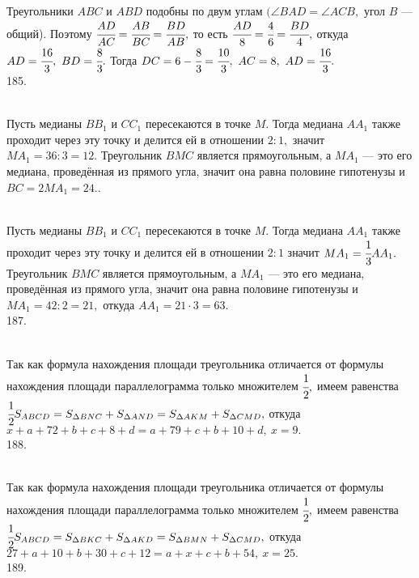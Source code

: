 Треугольники $ABC$ и $ABD$ подобны по двум углам $(\angle BAD = \angle ACB,$ угол $B$ --- общий). Поэтому $\cfrac{AD}{AC}=\cfrac{AB}{BC}=\cfrac{BD}{AB},$ то есть
$\cfrac{AD}{8}=\cfrac{4}{6}=\cfrac{BD}{4},$ откуда $AD=\cfrac{16}{3},\ BD=\cfrac{8}{3}.$ Тогда $DC=6-\cfrac{8}{3}=\cfrac{10}{3},\ AC=8,\ AD=\cfrac{16}{3}.$\\
185. \begin{figure}[ht!]
\end{figure}\\
Пусть медианы $BB_1$ и $CC_1$ пересекаются в точке $M.$ Тогда медиана $AA_1$ также проходит через эту точку и делится ей в отношении $2:1,$ значит $MA_1=36:3=12.$ Треугольник $BMC$ является прямоугольным, а $MA_1$ --- это его медиана, проведённая из прямого угла, значит она равна половине гипотенузы и $BC=2MA_1=24.$\newpage{}. \begin{figure}[ht!]
\end{figure}\\
Пусть медианы $BB_1$ и $CC_1$ пересекаются в точке $M.$ Тогда медиана $AA_1$ также проходит через эту точку и делится ей в отношении $2:1$ значит $MA_1=\cfrac{1}{3}AA_1.$ Треугольник $BMC$ является прямоугольным, а $MA_1$ --- это его медиана, проведённая из прямого угла, значит она равна половине гипотенузы и $MA_1=42:2=21,$ откуда $AA_1=21\cdot3=63.$\\
187. \begin{figure}[ht!]
\end{figure}\\
Так как формула нахождения площади треугольника отличается от формулы нахождения площади параллелограмма только множителем $\cfrac{1}{2},$ имеем равенства
$\cfrac{1}{2}S_{ABCD}=S_{\Delta BNC}+S_{\Delta AND}=S_{\Delta AKM}+S_{\Delta CMD},$ откуда $x+a+72+b+c+8+d=a+79+c+b+10+d,\ x=9.$\\
188. \begin{figure}[ht!]
\end{figure}\\
Так как формула нахождения площади треугольника отличается от формулы нахождения площади параллелограмма только множителем $\cfrac{1}{2},$ имеем равенства
$\cfrac{1}{2}S_{ABCD}=S_{\Delta BKC}+S_{\Delta AKD}=S_{\Delta BMN}+S_{\Delta CMD},$ откуда $27+a+10+b+30+c+12=a+x+c+b+54,\ x=25.$\\
189. \begin{figure}[ht!]
\end{figure}\\
